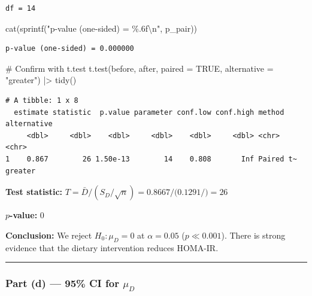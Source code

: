 \documentclass[
  letterpaper,
  DIV=11,
  numbers=noendperiod]{scrartcl}
\newenvironment{Shaded}{\begin{snugshade}}{\end{snugshade}}
\newcommand{\AttributeTok}[1]{\textcolor[rgb]{0.40,0.45,0.13}{#1}}
\newcommand{\CommentTok}[1]{\textcolor[rgb]{0.37,0.37,0.37}{#1}}
\newcommand{\ConstantTok}[1]{\textcolor[rgb]{0.56,0.35,0.01}{#1}}
\newcommand{\FunctionTok}[1]{\textcolor[rgb]{0.28,0.35,0.67}{#1}}
\newcommand{\NormalTok}[1]{\textcolor[rgb]{0.00,0.23,0.31}{#1}}
\newcommand{\SpecialCharTok}[1]{\textcolor[rgb]{0.37,0.37,0.37}{#1}}
\newcommand{\StringTok}[1]{\textcolor[rgb]{0.13,0.47,0.30}{#1}}
\begin{document}
\begin{verbatim}
df = 14
\end{verbatim}

\begin{Shaded}
\begin{Highlighting}[]
\FunctionTok{cat}\NormalTok{(}\FunctionTok{sprintf}\NormalTok{(}\StringTok{"p{-}value (one{-}sided) = \%.6f}\SpecialCharTok{\textbackslash{}n}\StringTok{"}\NormalTok{, p\_pair))}
\end{Highlighting}
\end{Shaded}

\begin{verbatim}
p-value (one-sided) = 0.000000
\end{verbatim}

\begin{Shaded}
\begin{Highlighting}[]
\CommentTok{\# Confirm with t.test}
\FunctionTok{t.test}\NormalTok{(before, after, }\AttributeTok{paired =} \ConstantTok{TRUE}\NormalTok{, }\AttributeTok{alternative =} \StringTok{"greater"}\NormalTok{) }\SpecialCharTok{|\textgreater{}} \FunctionTok{tidy}\NormalTok{()}
\end{Highlighting}
\end{Shaded}

\begin{verbatim}
# A tibble: 1 x 8
  estimate statistic  p.value parameter conf.low conf.high method    alternative
     <dbl>     <dbl>    <dbl>     <dbl>    <dbl>     <dbl> <chr>     <chr>      
1    0.867        26 1.50e-13        14    0.808       Inf Paired t~ greater    
\end{verbatim}

\textbf{Test statistic:}
\(T = \bar{D}/(S_D/\sqrt{n}) = 0.8667 / (0.1291/\)\() = 26\)

\textbf{\(p\)-value:} \(0\)

\textbf{Conclusion:} We reject \(H_0: \mu_D = 0\) at \(\alpha = 0.05\)
(\(p \ll 0.001\)). There is strong evidence that the dietary
intervention reduces HOMA-IR.

\begin{center}\rule{0.5\linewidth}{0.5pt}\end{center}

\subsubsection{\texorpdfstring{Part (d) --- 95\% CI for
\(\mu_D\)}{Part (d) --- 95\% CI for \textbackslash mu\_D}}\label{part-d-95-ci-for-mu_d}
\end{document}

